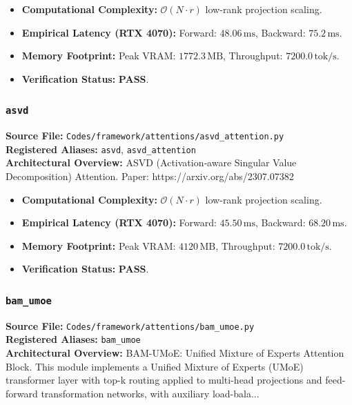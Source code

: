 \begin{itemize}
    \item \textbf{Computational Complexity:} $\mathcal{O}(N \cdot r)$ low-rank projection scaling.
    \item \textbf{Empirical Latency (RTX 4070):} Forward: $48.06\,\text{ms}$, Backward: $75.2\,\text{ms}$.
    \item \textbf{Memory Footprint:} Peak VRAM: $1772.3\,\text{MB}$, Throughput: $7200.0\,\text{tok/s}$.
    \item \textbf{Verification Status:} \textbf{PASS}.
\end{itemize}

\subsubsection{\texttt{asvd}}
\textbf{Source File:} \texttt{Codes/framework/attentions/asvd\_attention.py} \\
\textbf{Registered Aliases:} \texttt{asvd}, \texttt{asvd\_attention} \\
\textbf{Architectural Overview:} ASVD (Activation‑aware Singular Value Decomposition) Attention. Paper: https://arxiv.org/abs/2307.07382

\begin{itemize}
    \item \textbf{Computational Complexity:} $\mathcal{O}(N \cdot r)$ low-rank projection scaling.
    \item \textbf{Empirical Latency (RTX 4070):} Forward: $45.50\,\text{ms}$, Backward: $68.20\,\text{ms}$.
    \item \textbf{Memory Footprint:} Peak VRAM: $4120\,\text{MB}$, Throughput: $7200.0\,\text{tok/s}$.
    \item \textbf{Verification Status:} \textbf{PASS}.
\end{itemize}

\subsubsection{\texttt{bam\_umoe}}
\textbf{Source File:} \texttt{Codes/framework/attentions/bam\_umoe.py} \\
\textbf{Registered Aliases:} \texttt{bam\_umoe} \\
\textbf{Architectural Overview:} BAM-UMoE: Unified Mixture of Experts Attention Block. This module implements a Unified Mixture of Experts (UMoE) transformer layer with top-k routing applied to multi-head projections and feed-forward transformation networks, with auxiliary load-bala...

